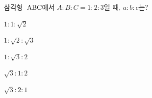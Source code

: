 삼각형~$\mathrm{ABC}$에서 $A:B:C=1:2:3$일 때, $a:b:c$는?
\begin{choices32}{\rule[-3ex]{0pt}{8ex}$1:1:\sqrt{2}$}{\rule[-3ex]{0pt}{8ex}$1:\sqrt{2}:\sqrt{3}$}{\rule[-3ex]{0pt}{8ex}$1:\sqrt{3}:2$}{\rule[-3ex]{0pt}{8ex}$\sqrt{3}:1:2$}{\rule[-3ex]{0pt}{8ex}$\sqrt{3}:2:1$}\end{choices32}
